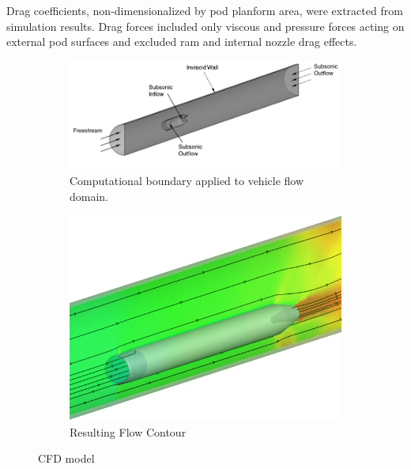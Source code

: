     Drag coefficients, non-dimensionalized by pod planform area,
    were extracted from simulation results.
    Drag forces included only viscous and pressure forces acting on external
    pod surfaces and excluded ram and internal nozzle drag effects.

    \begin{figure}
      \centering
      \begin{subfigure}[t]{.5\textwidth}
        \centering
        \includegraphics{../../images/CFDmodel.png}
        \caption{Computational boundary applied to vehicle flow domain.}
        \label{fig:CFDmodel}
      \end{subfigure}%
      \begin{subfigure}[t]{.5\textwidth}
        \centering
        \includegraphics[width=.75\textwidth]{../../images/hyperloopIsoView.png}
        \caption{Resulting Flow Contour}
      \label{fig:CFDresults}
      \end{subfigure}
      \caption{CFD model}
      \label{fig:CFD}
    \end{figure}


